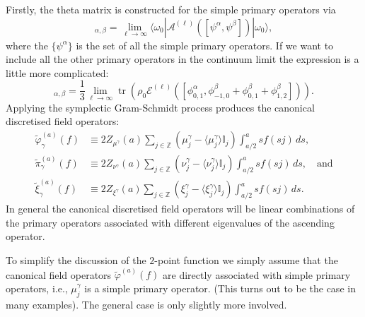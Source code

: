 \documentclass[prl,twocolumn,lengthcheck,superscriptaddress]{revtex4-1}
\newcommand{\tr}{\operatorname{tr}}
\theoremstyle{definition}
\theoremstyle{remark}
\begin{document}
Firstly, the theta matrix is constructed for the simple primary operators via
\begin{equation}
	[\Theta]_{\alpha,\beta} = \lim_{\ell\rightarrow \infty} \langle\omega_0| \mathcal{A}^{(\ell)}([\psi^\alpha,\psi^\beta])|\omega_0\rangle,
\end{equation} 
where the $\{\psi^\alpha\}$ is the set of all the simple primary operators. If we want to include all the other primary operators in the continuum limit the expression is a little more complicated:
\begin{equation}
	[\Theta]_{\alpha,\beta} = \frac{1}{3}\lim_{\ell\rightarrow \infty} \tr(\rho_0 \mathcal{E}^{(\ell)}([\phi^\alpha_{0,1},\phi^\beta_{-1,0}+\phi^\beta_{0,1}+\phi^\beta_{1,2}])).
\end{equation}
Applying the symplectic Gram-Schmidt process produces the canonical discretised field operators:
\begin{equation}
	\begin{split}
		\widetilde{\varphi}^{(a)}_\gamma(f) &\equiv 2Z_{\mu^{\gamma}}(a) \sum_{j\in \mathbb{Z}} (\mu_j^{\gamma} - \langle   \mu_j^{\gamma}\rangle \mathbb{I}_j)\int_{a/2}^a s f(sj) \,ds,\\
		\widetilde{\pi}^{(a)}_{\gamma}(f) &\equiv 2Z_{\nu^{\gamma}}(a) \sum_{j\in \mathbb{Z}}  (\nu_j^{\gamma} - \langle   \nu_j^{\gamma}\rangle \mathbb{I}_j)\int_{a/2}^a s f(sj)\,ds, \quad \text{and}\\
		\widetilde{\xi}^{(a)}_{\gamma}(f) &\equiv 2Z_{\xi^{\gamma}}(a) \sum_{j\in \mathbb{Z}}  (\xi_j^{\gamma} - \langle \xi_j^{\gamma}\rangle \mathbb{I}_j)\int_{a/2}^a s f(sj) \,ds.
	\end{split}
\end{equation}
In general the canonical discretised field operators will be linear combinations of the primary operators associated with different eigenvalues of the ascending operator. 

To simplify the discussion of the $2$-point function we simply assume that the canonical field operators $\widetilde{\varphi}^{(a)}(f)$ are directly associated with simple primary operators, i.e., $\mu_j^{\gamma}$ is a simple primary operator. (This turns out to be the case in many examples). The general case is only slightly more involved.
\end{document}
